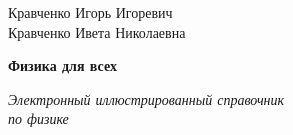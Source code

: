 \begin{titlepage}
    \begin{center}
        \vspace*{0.5cm}
        
        \Large
        Кравченко Игорь Игоревич\\
        Кравченко Ивета Николаевна
        
        \vspace{1cm}
        \Huge
        \textbf{Физика для всех}
        
        \vspace{1.5cm}
        
        \vfill
        \Large
        \textit{Электронный иллюстрированный справочник\\
        по физике}
        
        \vspace{15cm}

    \end{center}
\end{titlepage}
